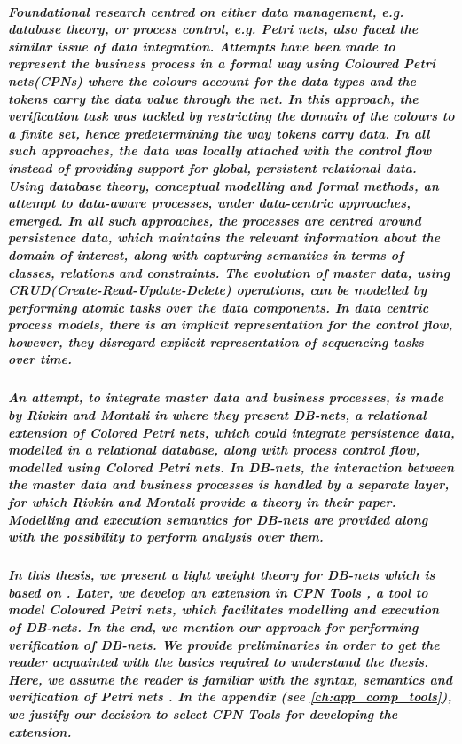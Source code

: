 \subparagraph*{\textnormal{Foundational research centred on either data management, e.g. database theory, or process control, e.g. Petri nets, also faced the similar issue of data integration. Attempts have been made to represent the business process in a formal way using Coloured Petri nets(CPNs) where the colours account for the data types and the tokens carry the data value through the net. In this approach, the verification task was tackled by restricting the domain of the colours to a finite set, hence predetermining the way tokens carry data. In all such approaches, the data was locally attached with the control flow instead of providing support for global, persistent relational data. Using database theory, conceptual modelling and formal methods, an attempt to data-aware processes, under data-centric approaches, emerged. In all such approaches, the processes are centred around persistence data, which maintains the relevant information about the domain of interest, along with capturing semantics in terms of classes, relations and constraints. The evolution of master data, using CRUD(Create-Read-Update-Delete) operations, can be modelled by performing atomic tasks over the data components. In data centric process models, there is an implicit representation for the control flow, however, they disregard explicit representation of sequencing tasks over time.}}

\subparagraph*{\textnormal{An attempt, to integrate master data and business processes, is made by Rivkin and Montali in \cite{DBLP:journals/corr/DBNets} where they present DB-nets, a relational extension of Colored Petri nets, which could integrate persistence data, modelled in a relational database, along with process control flow, modelled using Colored Petri nets. In DB-nets, the interaction between the master data and business processes is handled by a separate layer, for which Rivkin and Montali provide a theory in their paper. Modelling and execution semantics for DB-nets are provided along with the possibility to perform analysis over them.}}

\subparagraph*{\textnormal{In this thesis, we present a light weight theory for DB-nets which is based on \cite{DBLP:journals/corr/DBNets}. Later, we develop an extension in CPN Tools \cite{CPN_Tools}, a tool to model Coloured Petri nets, which facilitates modelling and execution of DB-nets. In the end, we mention our approach for performing verification of DB-nets. We provide preliminaries in order to get the reader acquainted with the basics required to understand the thesis. Here, we assume the reader is familiar with the syntax, semantics and verification of Petri nets \cite{DBLP:books/daglib/Reisig2013}. In the appendix (see \ref{ch:app_comp_tools}), we justify our decision to select CPN Tools for developing the extension.}}

